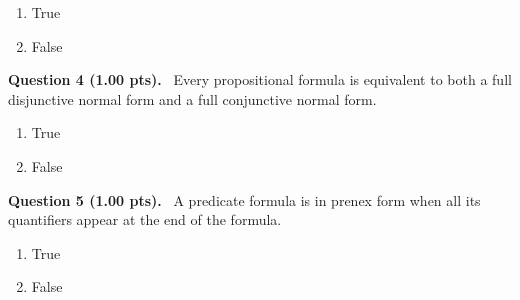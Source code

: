 \documentclass[12pt,a4paper]{article}
\begin{document}
\begin{enumerate}[label=\textbf{\Alph*.}]
  \item True
  \item False
\end{enumerate}



\vspace{0.5em}


\noindent
\textbf{Question 4 (1.00 pts).}~
Every propositional formula is equivalent to both a full disjunctive normal form and a full conjunctive normal form.


\begin{enumerate}[label=\textbf{\Alph*.}]
  \item True
  \item False
\end{enumerate}



\vspace{0.5em}


\noindent
\textbf{Question 5 (1.00 pts).}~
A predicate formula is in prenex form when all its quantifiers appear at the end of the formula.


\begin{enumerate}[label=\textbf{\Alph*.}]
  \item True
  \item False
\end{enumerate}
\end{document}
